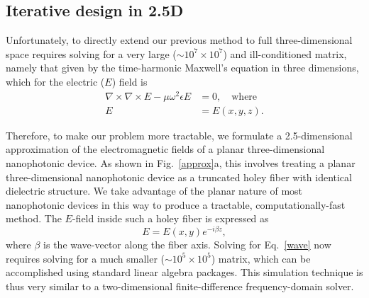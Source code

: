 %  
% 
% 
\subsection{Iterative design in 2.5D}
Unfortunately, to directly extend our previous method to full three-dimensional space requires solving for a very large ($\sim 10^7 \times 10^7$) and ill-conditioned matrix, namely that given by the time-harmonic Maxwell's equation in three dimensions, which for the electric ($E$) field is
\begin{align}
\nabla\times\nabla\times E - \mu\omega^2\epsilon E &= 0,\quad\text{where}\label{wave} \\
E &= E(x,y,z).
\end{align}

Therefore, to make our problem more tractable, we formulate a 2.5-dimensional approximation of the electromagnetic fields of a planar three-dimensional nanophotonic device\cite{Lu11}. As shown in Fig.~\ref{approx}a, this involves treating a planar three-dimensional nanophotonic device as a truncated holey fiber with identical dielectric structure. We take advantage of the planar nature of most nanophotonic devices in this way to produce a tractable, computationally-fast method. The $E$-field inside such a holey fiber is expressed as
\begin{equation}
E = E(x,y)e^{-i\beta z},
\end{equation}
where $\beta$ is the wave-vector along the fiber axis. Solving for Eq.~\ref{wave} now requires solving for a much smaller ($\sim 10^5 \times 10^5$) matrix, which can be accomplished using standard linear algebra packages. This simulation technique is thus very similar to a two-dimensional finite-difference frequency-domain solver.

